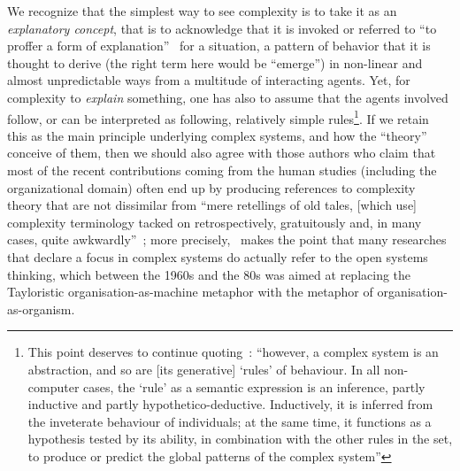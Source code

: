 \documentclass{article}
\begin{document}
We recognize that the simplest way to see complexity is to take it as an \emph{explanatory concept}, that is to acknowledge that it is invoked or referred to ``to proffer a form of explanation''~\citep{paley_complexity_2011} for a situation, a pattern of behavior that it is thought to derive (the right term here would be ``emerge'') in non-linear and almost unpredictable ways from a multitude of interacting agents. Yet, for complexity to \emph{explain} something, one has also to assume that the agents involved follow, or can be interpreted as following, relatively simple rules\footnote{This point deserves to continue quoting~\citet{paley_complexity_2011}: ``however, a complex system is an abstraction, and so are [its generative] `rules' of behaviour. In all non-computer cases, the `rule' as a semantic expression is an inference, partly inductive and partly hypothetico-deductive. Inductively, it is inferred from the inveterate behaviour of individuals; at the same time, it functions as a hypothesis tested by its ability, in combination with the other rules in the set, to produce or predict the global patterns of the complex system''}. If we retain this as the main principle underlying complex systems, and how the ``theory'' conceive of them, then we should also agree with those authors who claim that most of the recent contributions coming from the human studies (including the organizational domain) often end up by producing references to complexity theory that are not dissimilar from ``mere retellings of old tales, [which use] complexity terminology tacked on retrospectively, gratuitously and, in many cases, quite awkwardly''~\citep{maguire_complexity_1999}; more precisely,~\citet{paley_complex_2007} makes the point that many researches that declare a focus in complex systems do actually refer to the open systems thinking, which between the 1960s and the 80s was aimed at replacing the Tayloristic organisation-as-machine metaphor with the metaphor of organisation-as-organism. 
\end{document}
